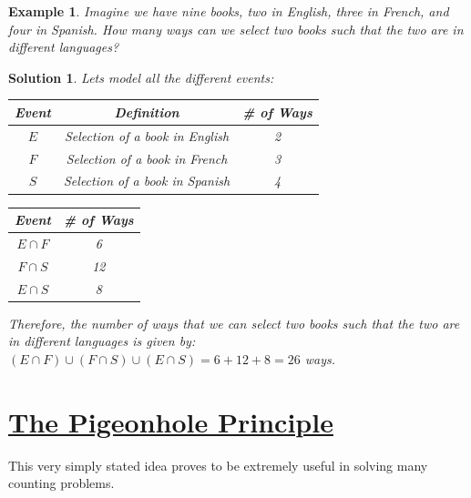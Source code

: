 \documentclass[12pt, letterpaper, onecolumn, conference, final]{IEEEtran}
\theoremstyle{definition}
\newtheorem{definition}{Definition}[section]
\theoremstyle{plain}
\newtheorem{example}{Example}[section]
\newtheorem{solution}{Solution}[section]
\begin{document}
\begin{example}
Imagine we have nine books, two in English, three in French, and four in Spanish. How many ways can we select two books such that the two are in different languages?
\end{example}
\begin{solution}
Lets model all the different events:
\begin{center}
\begin{tabular}{| c | c | c |}
\hline
Event & Definition & \# of Ways \\ \hline
$E$ & Selection of a book in English & 2 \\ \hline
$F$ & Selection of a book in French & 3 \\ \hline
$S$ & Selection of a book in Spanish & 4 \\ \hline
\end{tabular}
\end{center}
\begin{center}
\begin{tabular}{| c | c |}
\hline
Event & \# of Ways \\ \hline
$E \cap F$ & 6 \\ \hline
$F \cap S$ & 12 \\ \hline
$E \cap S$ & 8 \\ \hline
\end{tabular}
\end{center}
Therefore, the number of ways that we can select two books such that the two are in different languages is given by: $(E \cap F) \cup (F \cap S) \cup (E \cap S) = 6 + 12 + 8 = 26$ ways.
\end{solution}

\vspace{.3cm}
\section{\textbf{\underline{The Pigeonhole Principle}}}
\vspace{.3cm}
\noindent
This very simply stated idea proves to be extremely useful in solving many counting problems.
\begin{center}
\end{center}
\end{document}
